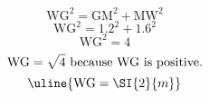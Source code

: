 \[\text{WG}^{2}=\text{GM}^{2}+\text{MW}^{2}\]
\[\text{WG}^{2}=1.2^{2}+1.6^{2}\]
\[\text{WG}^{2}=4\]
\[\text{WG}=\sqrt{\mathstrut 4}\text{ because WG is positive.}\]
\[\uline{\text{WG}=\SI{2}{m}}\]
